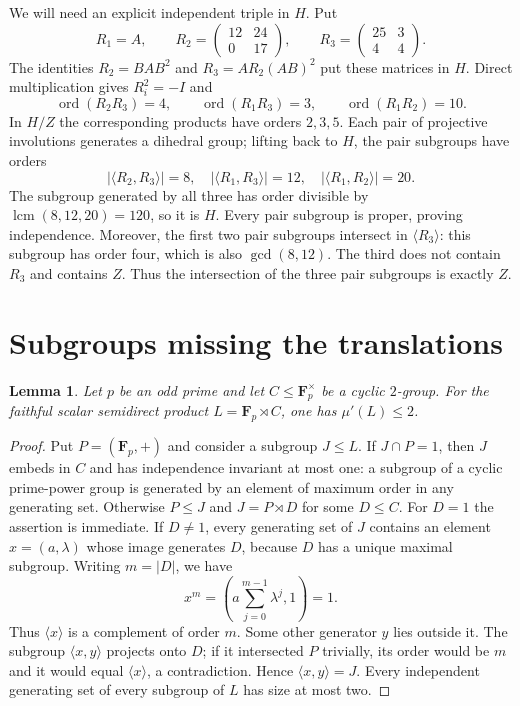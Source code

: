 \IfFileExists{baustms.cls}{\bulletinformattrue\documentclass[plain]{baustms}}{\bulletinformatfalse\documentclass[11pt]{amsart}}
\theoremstyle{cupthm}
\newtheorem{lemma}[theorem]{Lemma}
\newcommand{\F}{\mathbf F}
\newcommand{\mup}{\mu'}
\begin{document}
We will need an explicit independent triple in $H$. Put
\begin{equation}\label{eq:R}
 R_1=A,\qquad
 R_2=\begin{pmatrix}12&24\\0&17\end{pmatrix},\qquad
 R_3=\begin{pmatrix}25&3\\4&4\end{pmatrix}.
\end{equation}
The identities $R_2=BAB^2$ and $R_3=AR_2(AB)^2$ put these matrices in
$H$. Direct multiplication gives $R_i^2=-I$ and
\[
 \operatorname{ord}(R_2R_3)=4,\qquad
 \operatorname{ord}(R_1R_3)=3,\qquad
 \operatorname{ord}(R_1R_2)=10.
\]
In $H/Z$ the corresponding products have orders $2,3,5$.
Each pair of projective involutions generates a dihedral group; lifting
back to $H$, the pair subgroups have orders
\begin{equation}\label{eq:pairs}
 |\langle R_2,R_3\rangle|=8,\quad
 |\langle R_1,R_3\rangle|=12,\quad
 |\langle R_1,R_2\rangle|=20.
\end{equation}
The subgroup generated by all three has order divisible by
$\operatorname{lcm}(8,12,20)=120$, so it is $H$. Every pair subgroup
is proper, proving independence. Moreover, the first two pair subgroups
intersect in $\langle R_3\rangle$: this subgroup has order four, which
is also $\gcd(8,12)$. The third does not contain $R_3$ and contains $Z$.
Thus the intersection of the three pair subgroups is exactly $Z$.

\section{Subgroups missing the translations}
\begin{lemma}\label{lem:line}
Let $p$ be an odd prime and let $C\le\F_p^\times$ be a cyclic
$2$-group. For the faithful scalar semidirect product
$L=\F_p\rtimes C$, one has $\mup(L)\le2$.
\end{lemma}
\begin{proof}
Put $P=(\F_p,+)$ and consider a subgroup $J\le L$.
If $J\cap P=1$, then $J$ embeds in $C$ and has independence invariant
at most one: a subgroup of a cyclic prime-power group is generated by
an element of maximum order in any generating set.
Otherwise $P\le J$ and $J=P\rtimes D$ for some $D\le C$.
For $D=1$ the assertion is immediate. If $D\ne1$, every generating
set of $J$ contains an element $x=(a,\lambda)$ whose image generates
$D$, because $D$ has a unique maximal subgroup. Writing $m=|D|$, we have
\[
 x^m=\left(a\sum_{j=0}^{m-1}\lambda^j,1\right)=1.
\]
Thus $\langle x\rangle$ is a complement of order $m$.
Some other generator $y$ lies outside it. The subgroup $\langle x,y\rangle$
projects onto $D$; if it intersected $P$ trivially, its order would be
$m$ and it would equal $\langle x\rangle$, a contradiction.
Hence $\langle x,y\rangle=J$. Every independent generating set of
every subgroup of $L$ has size at most two.
\end{proof}
\end{document}
